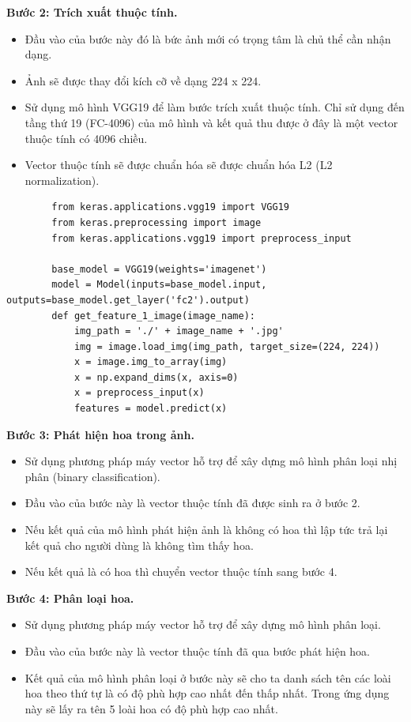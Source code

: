 \documentclass[12pt]{report}
\begin{document}
		\textbf{Bước 2: Trích xuất thuộc tính.} 
		\begin{itemize}
			\item Đầu vào của bước này đó là bức ảnh mới có trọng tâm là chủ thể cần nhận dạng.
			\item Ảnh sẽ được thay đổi kích cỡ về dạng 224 x 224.
			\item Sử dụng mô hình VGG19 \cite{cia_vgg19} để làm bước trích xuất thuộc tính. Chỉ sử dụng đến tầng thứ 19 (FC-4096) của mô hình và kết quả thu được ở đây là một vector thuộc tính có 4096 chiều.
			\item Vector thuộc tính sẽ được chuẩn hóa sẽ được chuẩn hóa L2 (L2 normalization).
		\end{itemize}
														
														
		\begin{lstlisting}
		from keras.applications.vgg19 import VGG19
		from keras.preprocessing import image
		from keras.applications.vgg19 import preprocess_input

		base_model = VGG19(weights='imagenet')
		model = Model(inputs=base_model.input,   outputs=base_model.get_layer('fc2').output)
		def get_feature_1_image(image_name):
			img_path = './' + image_name + '.jpg'
			img = image.load_img(img_path, target_size=(224, 224))
			x = image.img_to_array(img)
			x = np.expand_dims(x, axis=0)
			x = preprocess_input(x)
			features = model.predict(x)
		\end{lstlisting}
												
		\textbf{Bước 3: Phát hiện hoa trong ảnh.} 
		\begin{itemize}
			\item Sử dụng phương pháp máy vector hỗ trợ để xây dựng mô hình phân loại nhị phân (binary classification).
			\item Đầu vào của bước này là vector thuộc tính đã được sinh ra ở bước 2.
			\item Nếu kết quả của mô hình phát hiện ảnh là không có hoa thì lập tức trả lại kết quả cho người dùng là không tìm thấy hoa.
			\item Nếu kết quả là có hoa thì chuyển vector thuộc tính sang bước 4.
		\end{itemize}
														
														
		\textbf{Bước 4: Phân loại hoa.} 
		\begin{itemize}
			\item Sử dụng phương pháp máy vector hỗ trợ để xây dựng mô hình phân loại.
			\item Đầu vào của bước này là vector thuộc tính đã qua bước phát hiện hoa.
			\item Kết quả của mô hình phân loại ở bước này sẽ cho ta danh sách tên các loài hoa theo thứ tự là có độ phù hợp cao nhất đến thấp nhất. Trong ứng dụng này sẽ lấy ra tên 5 loài hoa có độ phù hợp cao nhất.
		\end{itemize}
														
\end{document}
